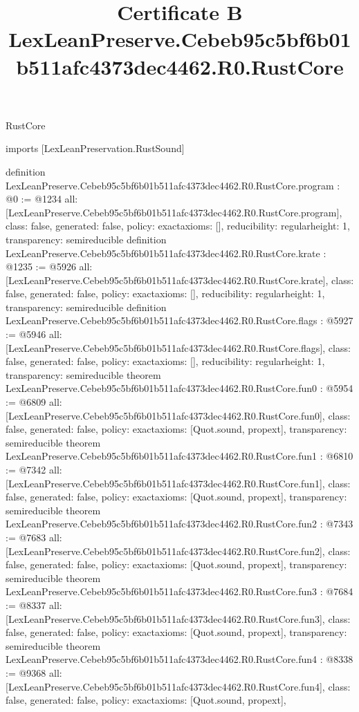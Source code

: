 \begin{lexlean}{RustCore}
\title{Certificate B LexLeanPreserve.Cebeb95c5bf6b01b511afc4373dec4462.R0.RustCore}
\begin{coremodule}
imports [LexLeanPreservation.RustSound]

definition LexLeanPreserve.Cebeb95c5bf6b01b511afc4373dec4462.R0.RustCore.program : @0 := @1234 {
  all: [LexLeanPreserve.Cebeb95c5bf6b01b511afc4373dec4462.R0.RustCore.program],
  class: false,
  generated: false,
  policy: exact{axioms: []},
  reducibility: regular{height: 1},
  transparency: semireducible
}
definition LexLeanPreserve.Cebeb95c5bf6b01b511afc4373dec4462.R0.RustCore.krate : @1235 := @5926 {
  all: [LexLeanPreserve.Cebeb95c5bf6b01b511afc4373dec4462.R0.RustCore.krate],
  class: false,
  generated: false,
  policy: exact{axioms: []},
  reducibility: regular{height: 1},
  transparency: semireducible
}
definition LexLeanPreserve.Cebeb95c5bf6b01b511afc4373dec4462.R0.RustCore.flags : @5927 := @5946 {
  all: [LexLeanPreserve.Cebeb95c5bf6b01b511afc4373dec4462.R0.RustCore.flags],
  class: false,
  generated: false,
  policy: exact{axioms: []},
  reducibility: regular{height: 1},
  transparency: semireducible
}
theorem LexLeanPreserve.Cebeb95c5bf6b01b511afc4373dec4462.R0.RustCore.fun0 : @5954 := @6809 {
  all: [LexLeanPreserve.Cebeb95c5bf6b01b511afc4373dec4462.R0.RustCore.fun0],
  class: false,
  generated: false,
  policy: exact{axioms: [Quot.sound, propext]},
  transparency: semireducible
}
theorem LexLeanPreserve.Cebeb95c5bf6b01b511afc4373dec4462.R0.RustCore.fun1 : @6810 := @7342 {
  all: [LexLeanPreserve.Cebeb95c5bf6b01b511afc4373dec4462.R0.RustCore.fun1],
  class: false,
  generated: false,
  policy: exact{axioms: [Quot.sound, propext]},
  transparency: semireducible
}
theorem LexLeanPreserve.Cebeb95c5bf6b01b511afc4373dec4462.R0.RustCore.fun2 : @7343 := @7683 {
  all: [LexLeanPreserve.Cebeb95c5bf6b01b511afc4373dec4462.R0.RustCore.fun2],
  class: false,
  generated: false,
  policy: exact{axioms: [Quot.sound, propext]},
  transparency: semireducible
}
theorem LexLeanPreserve.Cebeb95c5bf6b01b511afc4373dec4462.R0.RustCore.fun3 : @7684 := @8337 {
  all: [LexLeanPreserve.Cebeb95c5bf6b01b511afc4373dec4462.R0.RustCore.fun3],
  class: false,
  generated: false,
  policy: exact{axioms: [Quot.sound, propext]},
  transparency: semireducible
}
theorem LexLeanPreserve.Cebeb95c5bf6b01b511afc4373dec4462.R0.RustCore.fun4 : @8338 := @9368 {
  all: [LexLeanPreserve.Cebeb95c5bf6b01b511afc4373dec4462.R0.RustCore.fun4],
  class: false,
  generated: false,
  policy: exact{axioms: [Quot.sound, propext]},
}
\end{coremodule}
\end{lexlean}
